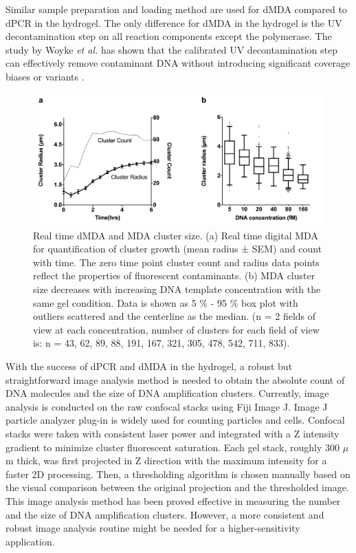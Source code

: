 Similar sample preparation and loading method are used for dMDA compared to dPCR in the hydrogel. The only difference for dMDA in the hydrogel is the UV decontamination step on all reaction components except the polymerase. The study by Woyke \textit{et al.} has shown that the calibrated UV decontamination step can effectively remove contaminant DNA without introducing significant coverage biases or variants \cite{Woyke:2011eg}. 

\begin{figure}
\includegraphics[keepaspectratio,width=1\textwidth]{./figures/Supp1_4.png}
\caption[Real time dMDA and MDA cluster size]{Real time dMDA and MDA cluster size. (a) Real time digital MDA for quantification of cluster growth (mean radius ± SEM) and count with time. The zero time point cluster count and radius data points reflect the properties of fluorescent contaminants. (b) MDA cluster size decreases with increasing DNA template concentration with the same gel condition. Data is shown as 5 \% - 95 \% box plot with outliers scattered and the centerline as the median. (n = 2 fields of view at each concentration, number of clusters for each field of view is: n = 43, 62, 89, 88, 191, 167, 321, 305, 478, 542, 711, 833).}
\label{fig:dMDA_Quant}
\end{figure}

With the success of dPCR and dMDA in the hydrogel, a robust but straightforward image analysis method is needed to obtain the absolute count of DNA molecules and the size of DNA amplification clusters. Currently, image analysis is conducted on the raw confocal stacks using Fiji Image J. Image J particle analyzer plug-in is widely used for counting particles and cells. Confocal stacks were taken with consistent laser power and integrated with a Z intensity gradient to minimize cluster fluorescent saturation. Each gel stack, roughly 300 $\mu$m thick, was first projected in Z direction with the maximum intensity for a faster 2D processing. Then, a thresholding algorithm is chosen manually based on the visual comparison between the original projection and the thresholded image. This image analysis method has been proved effective in measuring the number and the size of DNA amplification clusters. However, a more consistent and robust image analysis routine might be needed for a higher-sensitivity application. 

